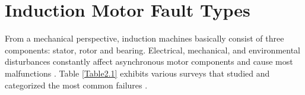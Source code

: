 

\pagebreak
\section{Induction Motor Fault Types}

From a mechanical perspective, induction machines basically consist of three components: stator, rotor and bearing. Electrical, mechanical, and environmental disturbances constantly affect asynchronous motor components and cause most malfunctions \cite{bonnet2010}. Table \ref{Table2.1} exhibits various surveys that studied and categorized the most common failures \cite{motor1985report,albrecht1986assessment,albrecht1987assessment,thorsen1995survey,bonnett2008increased}. 

